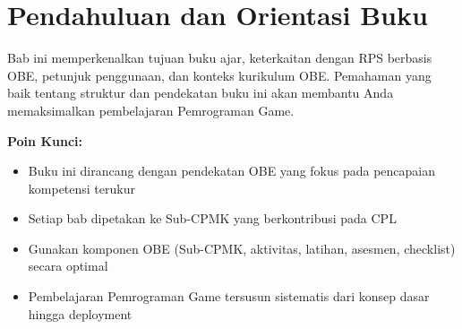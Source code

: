 \documentclass[../main]{subfiles}
\begin{document}
\chapter{Pendahuluan dan Orientasi Buku}







\begin{rangkuman}
Bab ini memperkenalkan tujuan buku ajar, keterkaitan dengan RPS berbasis OBE, petunjuk penggunaan, dan konteks kurikulum OBE. Pemahaman yang baik tentang struktur dan pendekatan buku ini akan membantu Anda memaksimalkan pembelajaran Pemrograman Game.

\textbf{Poin Kunci:}
\begin{itemize}
  \item Buku ini dirancang dengan pendekatan OBE yang fokus pada pencapaian kompetensi terukur
  \item Setiap bab dipetakan ke Sub-CPMK yang berkontribusi pada CPL
  \item Gunakan komponen OBE (Sub-CPMK, aktivitas, latihan, asesmen, checklist) secara optimal
  \item Pembelajaran Pemrograman Game tersusun sistematis dari konsep dasar hingga deployment
\end{itemize}
\end{rangkuman}

\ifSubfilesClassLoaded{
  \renewcommand{\bibname}{Daftar Pustaka}
  
  
}{}
\end{document}
